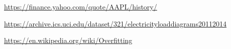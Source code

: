 
\begin{thebibliography}{99}






















	 \url{https://finance.yahoo.com/quote/AAPL/history/}

	 \url{https://archive.ics.uci.edu/dataset/321/electricityloaddiagrams20112014}

	 \url{https://en.wikipedia.org/wiki/Overfitting}


\end{thebibliography}
